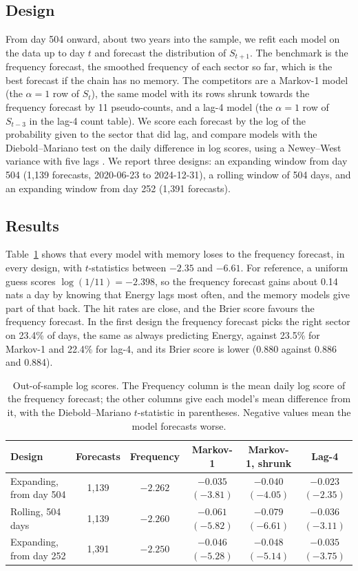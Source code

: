 \documentclass[11pt]{article}
\begin{document}
\subsection{Design}

From day 504 onward, about two years into the sample, we refit each model on the data up to day $t$ and forecast the distribution of $S_{t+1}$. The benchmark is the frequency forecast, the smoothed frequency of each sector so far, which is the best forecast if the chain has no memory. The competitors are a Markov-1 model (the $\alpha = 1$ row of $S_t$), the same model with its rows shrunk towards the frequency forecast by 11 pseudo-counts, and a lag-4 model (the $\alpha = 1$ row of $S_{t-3}$ in the lag-4 count table). We score each forecast by the log of the probability given to the sector that did lag, and compare models with the Diebold--Mariano test \cite{dieboldmariano1995} on the daily difference in log scores, using a Newey--West variance with five lags \cite{neweywest1987}. We report three designs: an expanding window from day 504 (1{,}139 forecasts, 2020-06-23 to 2024-12-31), a rolling window of 504 days, and an expanding window from day 252 (1{,}391 forecasts).

\subsection{Results}

Table~\ref{tab:oos} shows that every model with memory loses to the frequency forecast, in every design, with $t$-statistics between $-2.35$ and $-6.61$. For reference, a uniform guess scores $\log(1/11) = -2.398$, so the frequency forecast gains about 0.14 nats a day by knowing that Energy lags most often, and the memory models give part of that back. The hit rates are close, and the Brier score \cite{brier1950} favours the frequency forecast. In the first design the frequency forecast picks the right sector on 23.4\% of days, the same as always predicting Energy, against 23.5\% for Markov-1 and 22.4\% for lag-4, and its Brier score is lower (0.880 against 0.886 and 0.884).

\begin{table}[htbp]\centering
\caption{Out-of-sample log scores. The Frequency column is the mean daily log score of the frequency forecast; the other columns give each model's mean difference from it, with the Diebold--Mariano $t$-statistic in parentheses. Negative values mean the model forecasts worse.}
\label{tab:oos}
\footnotesize
\setlength{\tabcolsep}{4pt}
\begin{tabular}{lccccc}
\toprule
Design & Forecasts & Frequency & Markov-1 & Markov-1, shrunk & Lag-4 \\
\midrule
Expanding, from day 504 & 1{,}139 & $-2.262$ & $-0.035$ $(-3.81)$ & $-0.040$ $(-4.05)$ & $-0.023$ $(-2.35)$ \\
Rolling, 504 days & 1{,}139 & $-2.260$ & $-0.061$ $(-5.82)$ & $-0.079$ $(-6.61)$ & $-0.036$ $(-3.11)$ \\
Expanding, from day 252 & 1{,}391 & $-2.250$ & $-0.046$ $(-5.28)$ & $-0.048$ $(-5.14)$ & $-0.035$ $(-3.75)$ \\
\bottomrule
\end{tabular}
\end{table}
\end{document}
